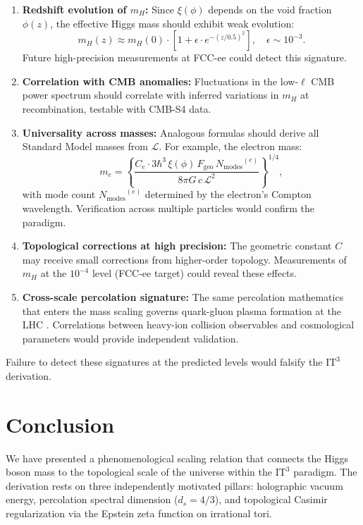 \documentclass[11pt,a4paper]{article}
\newcommand{\ITthree}{\ensuremath{\mathrm{IT}^3}}
\newcommand{\Ltop}{\ensuremath{\mathcal{L}}}
\newcommand{\xiPhi}{\ensuremath{\xi(\phi)}}
\newcommand{\Fgeo}{\ensuremath{F_{\mathrm{geo}}}}
\newcommand{\Nmodes}{\ensuremath{N_{\mathrm{modes}}}}
\begin{document}
\begin{enumerate}
    \item \textbf{Redshift evolution of $m_H$:} Since $\xiPhi$ depends on the void 
    fraction $\phi(z)$, the effective Higgs mass should exhibit weak evolution:
    \[
    m_H(z) \approx m_H(0) \cdot \left[1 + \epsilon \cdot e^{-(z/0.5)^2}\right], 
    \quad \epsilon \sim 10^{-3}.
    \]
    Future high-precision measurements at FCC-ee could detect this signature.

    \item \textbf{Correlation with CMB anomalies:} Fluctuations in the low-$\ell$ 
    CMB power spectrum should correlate with inferred variations in $m_H$ at 
    recombination, testable with CMB-S4 data.

    \item \textbf{Universality across masses:} Analogous formulas should derive 
    all Standard Model masses from $\Ltop$. For example, the electron mass:
    \[
    m_e = \left\{ \frac{C_e \cdot 3\hbar^3 \, \xiPhi \, \Fgeo \, \Nmodes^{(e)}}{8\pi G \, c \, \Ltop^2} \right\}^{1/4},
    \]
    with mode count $\Nmodes^{(e)}$ determined by the electron's Compton wavelength. 
    Verification across multiple particles would confirm the paradigm.

    \item \textbf{Topological corrections at high precision:} The geometric 
    constant $C$ may receive small corrections from higher-order topology. 
    Measurements of $m_H$ at the $10^{-4}$ level (FCC-ee target) could reveal 
    these effects.

    \item \textbf{Cross-scale percolation signature:} The same percolation 
    mathematics that enters the mass scaling governs quark-gluon plasma formation 
    at the LHC \citep{Logvinovich2026i}. Correlations between heavy-ion collision 
    observables and cosmological parameters would provide independent validation.
\end{enumerate}

Failure to detect these signatures at the predicted levels would falsify the 
$\ITthree$ derivation.

\section{Conclusion}
\label{sec:conclusion}

We have presented a phenomenological scaling relation that connects the Higgs 
boson mass to the topological scale of the universe within the $\ITthree$ paradigm. 
The derivation rests on three independently motivated pillars: holographic vacuum 
energy, percolation spectral dimension ($d_s = 4/3$), and topological Casimir 
regularization via the Epstein zeta function on irrational tori. 
\end{document}
